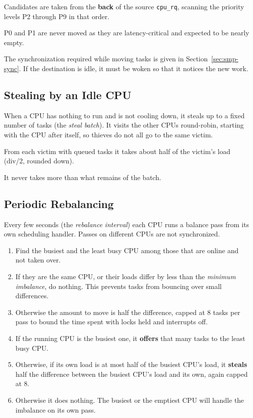 \documentclass[11pt]{article}
\begin{document}
Candidates are taken from the \textbf{back} of the source \texttt{cpu\_rq}, scanning the priority levels P2 through P9 in that order.

P0 and P1 are never moved as they are latency-critical and expected to be nearly empty.

The synchronization required while moving tasks is given in Section~\ref{sec:smp-sync}. If the destination is idle, it must be woken so that it notices the new work.

\subsection{Stealing by an Idle CPU}

When a CPU has nothing to run and is not cooling down, it steals up to a fixed number of tasks (the \textit{steal batch}).
It visits the other CPUs round-robin, starting with the CPU after itself, so thieves do not all go to the same victim.

From each victim with queued tasks it takes about half of the victim's load (div/2, rounded down).

It never takes more than what remains of the batch.

\subsection{Periodic Rebalancing}

Every few seconds (the \textit{rebalance interval}) each CPU runs a balance pass from its own scheduling handler. Passes on different CPUs are not synchronized.

\begin{enumerate}
	\item Find the busiest and the least busy CPU among those that are online and not taken over.
	\item If they are the same CPU, or their loads differ by less than the \textit{minimum imbalance}, do nothing. This prevents tasks from bouncing over small differences.
	\item Otherwise the amount to move is half the difference, capped at 8 tasks per pass to bound the time spent with locks held and interrupts off.
	\item If the running CPU is the busiest one, it \textbf{offers} that many tasks to the least busy CPU.
	\item Otherwise, if its own load is at most half of the busiest CPU's load, it \textbf{steals} half the difference between the busiest CPU's load and its own, again capped at 8.
	\item Otherwise it does nothing. The busiest or the emptiest CPU will handle the imbalance on its own pass.
\end{enumerate}
\end{document}
